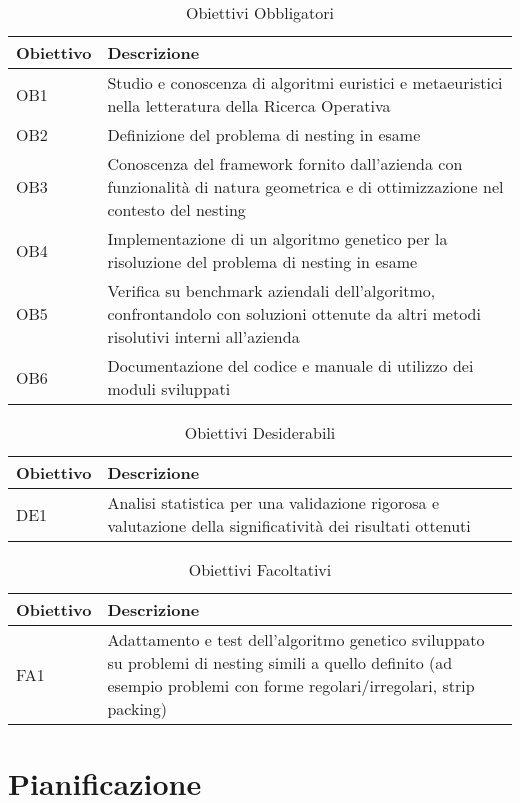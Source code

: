 \begin{table}[H]
\centering
\begin{tabular}{|l|p{10cm}|}
\hline
\textbf{Obiettivo} & \textbf{Descrizione} \\ \hline
OB1 & Studio e conoscenza di algoritmi euristici e metaeuristici nella letteratura della Ricerca Operativa \\ \hline
OB2 & Definizione del problema di nesting in esame \\ \hline
OB3 & Conoscenza del framework fornito dall’azienda con funzionalità di natura geometrica e di ottimizzazione nel contesto del nesting \\ \hline
OB4 & Implementazione di un algoritmo genetico per la risoluzione del problema di nesting in esame \\ \hline
OB5 & Verifica su benchmark aziendali dell’algoritmo, confrontandolo con soluzioni ottenute da altri metodi risolutivi interni all’azienda \\ \hline
OB6 & Documentazione del codice e manuale di utilizzo dei moduli sviluppati \\ \hline
\end{tabular}
\caption{Obiettivi Obbligatori}
\end{table}

\begin{table}[H]
\centering
\begin{tabular}{|l|p{10cm}|}
\hline
\textbf{Obiettivo} & \textbf{Descrizione} \\ \hline
DE1 & Analisi statistica per una validazione rigorosa e valutazione della significatività dei risultati ottenuti \\ \hline
\end{tabular}
\caption{Obiettivi Desiderabili}
\end{table}

\begin{table}[H]
\centering
\begin{tabular}{|l|p{10cm}|}
\hline
\textbf{Obiettivo} & \textbf{Descrizione} \\ \hline
FA1 & Adattamento e test dell'algoritmo genetico sviluppato su problemi di nesting simili a quello definito (ad esempio problemi con forme regolari/irregolari, strip packing) \\ \hline
\end{tabular}
\caption{Obiettivi Facoltativi}
\end{table}

\section{Pianificazione}

